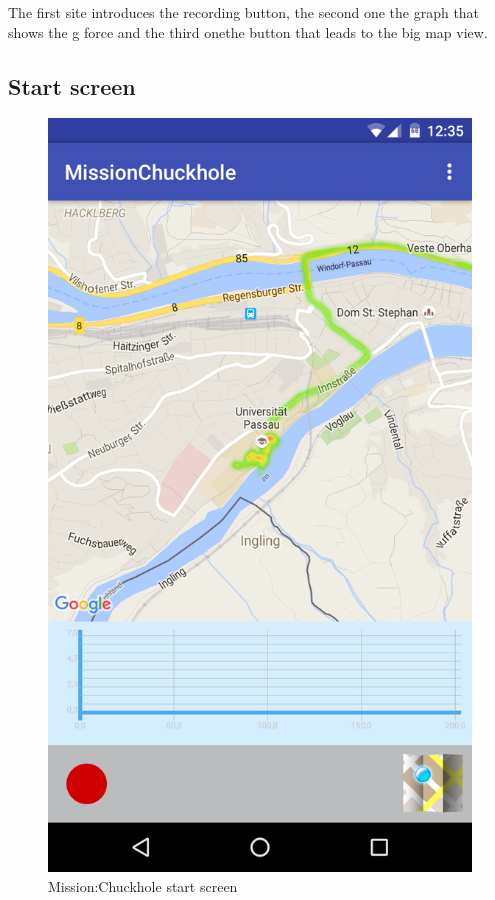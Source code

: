 \documentclass[10pt,a4paper]{article} %
\begin{document}
	\noindent
	The first site introduces the recording button, the second one the graph that shows the g force and the third onethe button that leads to the big map view.



	\subsection{Start screen}
		
		\begin{figure}[H]
		\begin{center}
 		  \includegraphics[scale=0.1]{img/startscreen.png}
		  \caption{Mission:Chuckhole start screen}
		  \label{fig:startscreen}
		\end{center}
		\end{figure}
\end{document}
